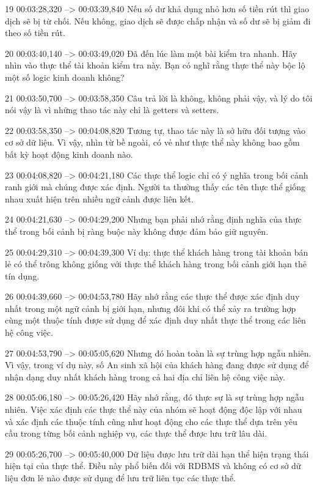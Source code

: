 19
00:03:28,320 --> 00:03:39,840
Nếu số dư khả dụng nhỏ hơn số tiền rút thì giao dịch sẽ bị từ chối.  Nếu không, giao dịch sẽ được chấp nhận và số dư sẽ bị giảm đi theo số tiền rút.

20
00:03:40,140 --> 00:03:49,020
Đã đến lúc làm một bài kiểm tra nhanh.  Hãy nhìn vào thực thể tài khoản kiểm tra này.  Bạn có nghĩ rằng thực thể này bộc lộ một số logic kinh doanh không?

21
00:03:50,700 --> 00:03:58,350
Câu trả lời là không, không phải vậy, và lý do tôi nói vậy là vì những thao tác này chỉ là getters và setters.

22
00:03:58,350 --> 00:04:08,820
Tương tự, thao tác này là sở hữu đối tượng vào cơ sở dữ liệu.  Vì vậy, nhìn từ bề ngoài, có vẻ như thực thể này không bao gồm bất kỳ hoạt động kinh doanh nào.

23
00:04:08,820 --> 00:04:21,180
Các thực thể logic chỉ có ý nghĩa trong bối cảnh ranh giới mà chúng được xác định.  Người ta thường thấy các tên thực thể giống nhau xuất hiện trên nhiều ngữ cảnh được liên kết.

24
00:04:21,630 --> 00:04:29,200
Nhưng bạn phải nhớ rằng định nghĩa của thực thể trong bối cảnh bị ràng buộc này không được đảm bảo giữ nguyên.

25
00:04:29,310 --> 00:04:39,300
Ví dụ: thực thể khách hàng trong tài khoản bán lẻ có thể trông không giống với thực thể khách hàng trong bối cảnh giới hạn thẻ tín dụng.

26
00:04:39,660 --> 00:04:53,780
Hãy nhớ rằng các thực thể được xác định duy nhất trong một ngữ cảnh bị giới hạn, nhưng đôi khi có thể xảy ra trường hợp cùng một thuộc tính được sử dụng để xác định duy nhất thực thể trong các liên hệ công việc.

27
00:04:53,790 --> 00:05:05,620
Nhưng đó hoàn toàn là sự trùng hợp ngẫu nhiên.  Vì vậy, trong ví dụ này, số An sinh xã hội của khách hàng đang được sử dụng để nhận dạng duy nhất khách hàng trong cả hai địa chỉ liên hệ công việc này.

28
00:05:06,180 --> 00:05:26,420
Hãy nhớ rằng, đó thực sự là sự trùng hợp ngẫu nhiên.  Việc xác định các thực thể này của nhóm sẽ hoạt động độc lập với nhau và xác định các thuộc tính cũng như hoạt động cho các thực thể dựa trên yêu cầu trong từng bối cảnh nghiệp vụ, các thực thể được lưu trữ lâu dài.

29
00:05:26,700 --> 00:05:40,000
Dữ liệu được lưu trữ dài hạn thể hiện trạng thái hiện tại của thực thể.  Điều này phổ biến đối với RDBMS và không có cơ sở dữ liệu đơn lẻ nào được sử dụng để lưu trữ liên tục các thực thể.

